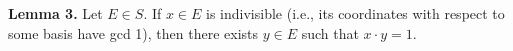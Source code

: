 \textbf{Lemma 3.} Let $E \in S$. If $x \in E$ is indivisible (i.e., its coordinates with respect to some basis have gcd 1), then there exists $y \in E$ such that $x \cdot y = 1$.
